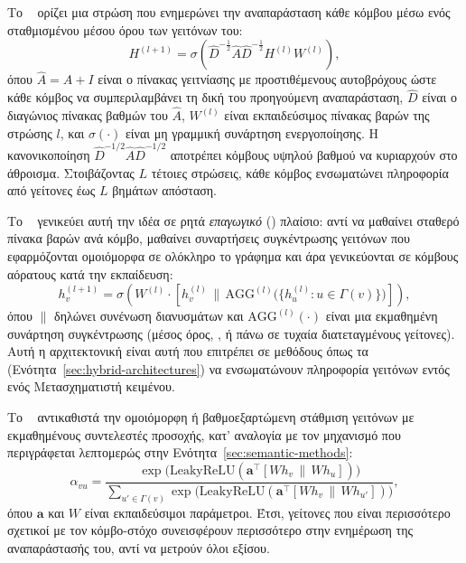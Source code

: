 Το \textbf{}~\cite{kipfwelling2017gcn} ορίζει
μια στρώση που ενημερώνει την αναπαράσταση κάθε κόμβου μέσω ενός σταθμισμένου μέσου
όρου των γειτόνων του:
\begin{equation}
    H^{(l+1)} = \sigma\!\left(\hat{D}^{-\frac{1}{2}} \hat{A} \hat{D}^{-\frac{1}{2}} H^{(l)} W^{(l)}\right),
    \label{eq:gcn}
\end{equation}
όπου $\hat{A} = A + I$ είναι ο πίνακας γειτνίασης με προστιθέμενους αυτοβρόχους ώστε
κάθε κόμβος να συμπεριλαμβάνει τη δική του προηγούμενη αναπαράσταση, $\hat{D}$ είναι ο
διαγώνιος πίνακας βαθμών του $\hat{A}$, $W^{(l)}$ είναι εκπαιδεύσιμος πίνακας βαρών
της στρώσης $l$, και $\sigma(\cdot)$ είναι μη γραμμική συνάρτηση ενεργοποίησης.
Η κανονικοποίηση $\hat{D}^{-1/2} \hat{A} \hat{D}^{-1/2}$ αποτρέπει κόμβους υψηλού
βαθμού να κυριαρχούν στο άθροισμα.
Στοιβάζοντας $L$ τέτοιες στρώσεις, κάθε κόμβος
ενσωματώνει πληροφορία από γείτονες έως $L$ βημάτων απόσταση.

Το \textbf{}~\cite{hamilton2017graphsage} γενικεύει αυτή την ιδέα σε
ρητά \textit{επαγωγικό} () πλαίσιο: αντί να μαθαίνει σταθερό πίνακα
βαρών ανά κόμβο, μαθαίνει συναρτήσεις συγκέντρωσης γειτόνων που εφαρμόζονται
ομοιόμορφα σε ολόκληρο το γράφημα και άρα γενικεύονται σε κόμβους αόρατους κατά την
εκπαίδευση:
\begin{equation}
    h_v^{(l+1)} = \sigma\!\left(W^{(l)} \cdot \left[h_v^{(l)} \, \| \, \mathrm{AGG}^{(l)}\bigl(\{h_u^{(l)} : u \in \Gamma(v)\}\bigr)\right]\right),
    \label{eq:graphsage}
\end{equation}
όπου $\|$ δηλώνει συνένωση διανυσμάτων και $\mathrm{AGG}^{(l)}(\cdot)$ είναι μια
εκμαθημένη συνάρτηση συγκέντρωσης (μέσος όρος, , ή  πάνω σε
τυχαία διατεταγμένους γείτονες).
Αυτή η αρχιτεκτονική είναι αυτή που επιτρέπει σε
μεθόδους όπως τα  (Ενότητα~\ref{sec:hybrid-architectures}) να
ενσωματώνουν πληροφορία γειτόνων εντός ενός Μετασχηματιστή κειμένου.

Το \textbf{}~\cite{velickovic2018gat} αντικαθιστά
την ομοιόμορφη ή βαθμοεξαρτώμενη στάθμιση γειτόνων με εκμαθημένους συντελεστές
προσοχής, κατ' αναλογία με τον μηχανισμό  που περιγράφεται
λεπτομερώς στην Ενότητα~\ref{sec:semantic-methods}:
\begin{equation}
    \alpha_{vu} = \frac{\exp\bigl(\mathrm{LeakyReLU}(\mathbf{a}^\top [W h_v \, \| \, W h_u])\bigr)}
    {\sum_{u' \in \Gamma(v)} \exp\bigl(\mathrm{LeakyReLU}(\mathbf{a}^\top [W h_v \, \| \, W h_{u'}])\bigr)},
    \label{eq:gat}
\end{equation}
όπου $\mathbf{a}$ και $W$ είναι εκπαιδεύσιμοι παράμετροι.
Έτσι, γείτονες που είναι
περισσότερο σχετικοί με τον κόμβο-στόχο συνεισφέρουν περισσότερο στην ενημέρωση της
αναπαράστασής του, αντί να μετρούν όλοι εξίσου.

